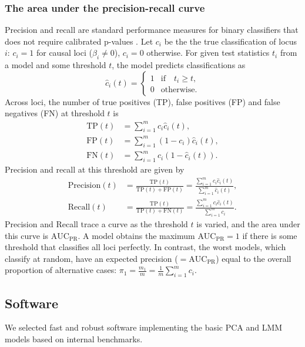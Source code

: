 \documentclass[11pt]{article}
\newcommand{\auc}{\text{AUC}_\text{PR}}
\begin{document}
\subsubsection{The area under the precision-recall curve}

Precision and recall are standard performance measures for binary classifiers that does not require calibrated p-values \citep{grau_prroc:_2015}.
Let $c_i$ be the the true classification of locus $i$: $c_i = 1$ for causal loci ($\beta_i \ne 0$), $c_i = 0$ otherwise.
For given test statistics $t_i$ from a model and some threshold $t$, the model predicts classifications as
$$
\hat{c}_i(t) =
\begin{cases}
  1 & \text{if} \quad t_i \ge t, \\
  0 & \text{otherwise}.
\end{cases}
$$
Across loci, the number of true positives (TP), false positives (FP) and false negatives (FN) at threshold $t$ is
\begin{align*}
  \text{TP}(t)
  &=
    \sum_{i = 1}^m c_i \hat{c}_i(t)
    , \\
  \text{FP}(t)
  &=
    \sum_{i = 1}^m (1 - c_i) \hat{c}_i(t)
    , \\
  \text{FN}(t)
  &=
    \sum_{i = 1}^m c_i \left( 1 - \hat{c}_i(t) \right)
    .
\end{align*}
Precision and recall at this threshold are given by
\begin{align*}
  \text{Precision}(t)
  &=
    \frac{ \text{TP}(t) }{ \text{TP}(t) + \text{FP}(t) }
    =
    \frac{ \sum_{i = 1}^m c_i \hat{c}_i(t) }{ \sum_{i = 1}^m \hat{c}_i(t) }
    , \\
  \text{Recall}(t)
  &=
    \frac{ \text{TP}(t) }{ \text{TP}(t) + \text{FN}(t) }
    =
    \frac{ \sum_{i = 1}^m c_i \hat{c}_i(t) }{ \sum_{i = 1}^m c_i }
    .
\end{align*}
Precision and Recall trace a curve as the threshold $t$ is varied, and the area under this curve is $\auc$.
A model obtains the maximum $\auc = 1$ if there is some threshold that classifies all loci perfectly.
In contrast, the worst models, which classify at random, have an expected precision ($= \auc$) equal to the overall proportion of alternative cases:
$\pi_1 = \frac{m_1}{m} = \frac{1}{m} \sum_{i = 1}^m c_i$.

\subsection{Software}

We selected fast and robust software implementing the basic PCA and LMM models based on internal benchmarks.
\end{document}
